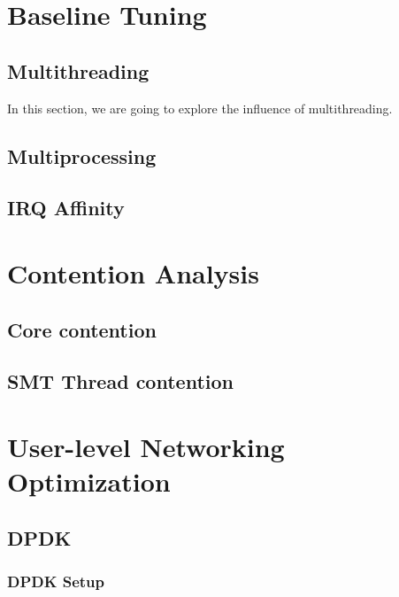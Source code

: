 \documentclass[bsc,frontabs,twoside,singlespacing,parskip,deptreport]{infthesis}     %
\begin{document}
\chapter{Baseline Tuning}



\section{Multithreading}
In this section, we are going to explore the influence of multithreading. 




\section{Multiprocessing}







\section{IRQ Affinity}






\chapter{Contention Analysis}

\section{Core contention}

\section{SMT Thread contention}





\chapter{User-level Networking Optimization}

\section{DPDK}

\subsection{DPDK Setup}
\end{document}
